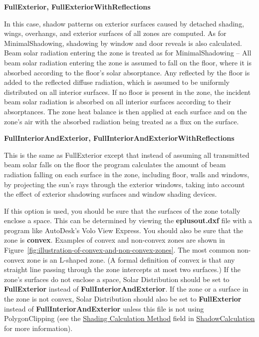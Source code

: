 \textbf{FullExterior, FullExteriorWithReflections}

In this case, shadow patterns on exterior surfaces caused by detached shading, wings, overhangs, and exterior surfaces of all zones are computed. As for MinimalShadowing, shadowing by window and door reveals is also calculated. Beam solar radiation entering the zone is treated as for MinimalShadowing -- All beam solar radiation entering the zone is assumed to fall on the floor, where it is absorbed according to the floor's solar absorptance. Any reflected by the floor is added to the reflected diffuse radiation, which is assumed to be uniformly distributed on all interior surfaces. If no floor is present in the zone, the incident beam solar radiation is absorbed on all interior surfaces according to their absorptances. The zone heat balance is then applied at each surface and on the zone's air with the absorbed radiation being treated as a flux on the surface.

\textbf{FullInteriorAndExterior, FullInteriorAndExteriorWithReflections}

This is the same as FullExterior except that instead of assuming all transmitted beam solar falls on the floor the program calculates the amount of beam radiation falling on each surface in the zone, including floor, walls and windows, by projecting the sun's rays through the exterior windows, taking into account the effect of exterior shadowing surfaces and window shading devices.

If this option is used, you should be sure that the surfaces of the zone totally enclose a space. This can be determined by viewing the \textbf{eplusout.dxf} file with a program like AutoDesk's Volo View Express. You should also be sure that the zone is \textbf{convex}. Examples of convex and non-convex zones are shown in Figure~\ref{fig:illustration-of-convex-and-non-convex-zones}. The most common non-convex zone is an L-shaped zone. (A formal definition of convex is that any straight line passing through the zone intercepts at most two surfaces.) If the zone's surfaces do not enclose a space, Solar Distribution should be set to \textbf{FullExterior} instead of \textbf{FullInteriorAndExterior}.  If the zone or a surface in the zone is not convex, Solar Distribution should also be set to \textbf{FullExterior} instead of \textbf{FullInteriorAndExterior} unless this file is not using PolygonClipping (see the \hyperref [field-shading-calculation-method]{Shading Calculation Method} field in \hyperref[shadowcalculation]{ShadowCalculation} for more information).

